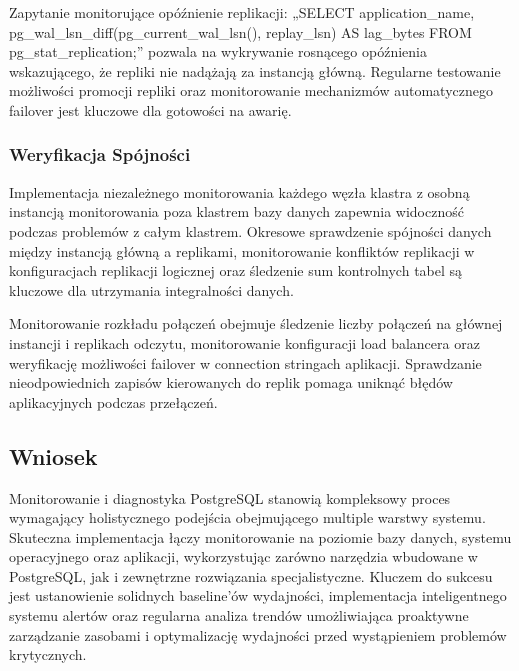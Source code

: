 \documentclass[letterpaper,10pt,polish]{sphinxmanual}
\begin{document}
\sphinxAtStartPar
Zapytanie monitorujące opóźnienie replikacji: „SELECT application\_name, pg\_wal\_lsn\_diff(pg\_current\_wal\_lsn(), replay\_lsn) AS lag\_bytes FROM pg\_stat\_replication;” pozwala na wykrywanie rosnącego opóźnienia wskazującego, że repliki nie nadążają za instancją główną. Regularne testowanie możliwości promocji repliki oraz monitorowanie mechanizmów automatycznego failover jest kluczowe dla gotowości na awarię.


\subsubsection{Weryfikacja Spójności}
\label{\detokenize{rozdzial2/repo-wspolne/index:weryfikacja-spojnosci}}
\sphinxAtStartPar
Implementacja niezależnego monitorowania każdego węzła klastra z osobną instancją monitorowania poza klastrem bazy danych zapewnia widoczność podczas problemów z całym klastrem. Okresowe sprawdzenie spójności danych między instancją główną a replikami, monitorowanie konfliktów replikacji w konfiguracjach replikacji logicznej oraz śledzenie sum kontrolnych tabel są kluczowe dla utrzymania integralności danych.

\sphinxAtStartPar
Monitorowanie rozkładu połączeń obejmuje śledzenie liczby połączeń na głównej instancji i replikach odczytu, monitorowanie konfiguracji load balancera oraz weryfikację możliwości failover w connection stringach aplikacji. Sprawdzanie nieodpowiednich zapisów kierowanych do replik pomaga uniknąć błędów aplikacyjnych podczas przełączeń.


\subsection{Wniosek}
\label{\detokenize{rozdzial2/repo-wspolne/index:wniosek}}
\sphinxAtStartPar
Monitorowanie i diagnostyka PostgreSQL stanowią kompleksowy proces wymagający holistycznego podejścia obejmującego multiple warstwy systemu. Skuteczna implementacja łączy monitorowanie na poziomie bazy danych, systemu operacyjnego oraz aplikacji, wykorzystując zarówno narzędzia wbudowane w PostgreSQL, jak i zewnętrzne rozwiązania specjalistyczne. Kluczem do sukcesu jest ustanowienie solidnych baseline’ów wydajności, implementacja inteligentnego systemu alertów oraz regularna analiza trendów umożliwiająca proaktywne zarządzanie zasobami i optymalizację wydajności przed wystąpieniem problemów krytycznych.
\end{document}
